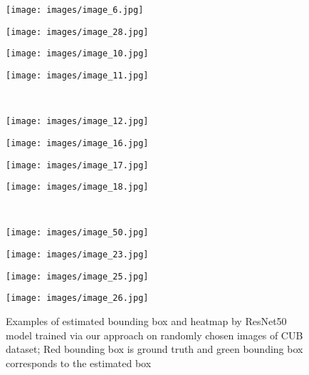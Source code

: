 \documentclass[runningheads]{llncs}
\begin{document}
\begin{figure*}[t]
\centering
    \begin{minipage}{.24\textwidth}
      \texttt{[image: images/image\_6.jpg]}
    \end{minipage}
    \begin{minipage}{.24\textwidth}
      \texttt{[image: images/image\_28.jpg]}
    \end{minipage}
    \begin{minipage}{.24\textwidth}
      \texttt{[image: images/image\_10.jpg]}
    \end{minipage}
    \begin{minipage}{.24\textwidth}
      \texttt{[image: images/image\_11.jpg]}
    \end{minipage}\\
    \begin{minipage}{.24\textwidth}
      \texttt{[image: images/image\_12.jpg]}
    \end{minipage}
    \begin{minipage}{.24\textwidth}
      \texttt{[image: images/image\_16.jpg]}
    \end{minipage}
    \begin{minipage}{.24\textwidth}
      \texttt{[image: images/image\_17.jpg]}
    \end{minipage}
    \begin{minipage}{.24\textwidth}
      \texttt{[image: images/image\_18.jpg]}
    \end{minipage}\\
    \begin{minipage}{.24\textwidth}
      \texttt{[image: images/image\_50.jpg]}
    \end{minipage}
    \begin{minipage}{.24\textwidth}
      \texttt{[image: images/image\_23.jpg]}
    \end{minipage}
    \begin{minipage}{.24\textwidth}
      \texttt{[image: images/image\_25.jpg]}
    \end{minipage}
    \begin{minipage}{.24\textwidth}
      \texttt{[image: images/image\_26.jpg]}
    \end{minipage}
    \caption{\footnotesize{Examples of estimated bounding box and heatmap by ResNet50 model trained via our approach on randomly chosen images of CUB dataset; Red bounding box is ground truth and green bounding box corresponds to the estimated box}}
    \label{fig:loc_our}
\end{figure*}
\end{document}
